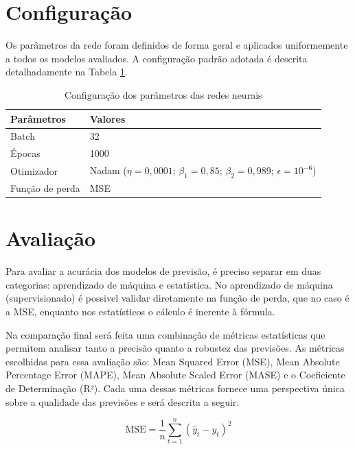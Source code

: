 \section{Configuração} \label{sec:configuracao} 
Os parâmetros da rede foram definidos de forma geral e aplicados uniformemente a todos os modelos avaliados. A configuração padrão adotada é descrita detalhadamente na Tabela \ref{tabela:parametros}.

\begin{table}[h!]
    \caption{Configuração dos parâmetros das redes neurais} \label{tabela:parametros}
    \begin{tabularx}{\textwidth}{X|X} \hline
    Parâmetros & Valores \\ \hline
    Batch         & 32               \\ \hline
    Épocas         & 1000              \\ \hline
    Otimizador               & Nadam ($\eta=0{,}0001$; $\beta_1=0{,}85$; $\beta_2=0{,}989$; $\epsilon=10^{-6}$)             \\ \hline
    Função de perda          & MSE              \\ \hline
    \end{tabularx}
\end{table}

\section{Avaliação} \label{sec:avaliacao}
Para avaliar a acurácia dos modelos de previsão, é preciso separar em duas categorias: aprendizado de máquina e estatística.
No aprendizado de máquina (supervisionado) é possivel validar diretamente na função de perda, que no caso é a MSE, enquanto nos estatísticos o cálculo é inerente à fórmula.

Na comparação final será feita uma combinação de métricas estatísticas 
que permitem analisar tanto a precisão quanto a robustez das previsões.
As métricas escolhidas para essa avaliação são: 
Mean Squared Error (MSE), Mean Absolute Percentage Error (MAPE), Mean Absolute Scaled Error (MASE) e o Coeficiente de Determinação (R²). Cada uma dessas métricas fornece uma perspectiva única sobre a qualidade das previsões e será descrita a seguir.

\begin{equation}
    \text{MSE} = \frac{1}{n} \sum_{t=1}^{n} (\hat{y}_t - y_t)^2
\end{equation}

